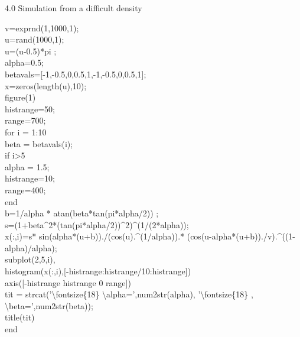 \documentclass[twoside,twocolumn]{article}
\begin{document}
\begin{large}
4.0 Simulation from a difficult density
\end{large}
\newline
\begin{itshape}
v=exprnd(1,1000,1);\\
u=rand(1000,1);\\
u=(u-0.5)*pi ;\\
alpha=0.5;\\
betavals=[-1,-0.5,0,0.5,1,-1,-0.5,0,0.5,1];\\
x=zeros(length(u),10);\\

figure(1)\\
histrange=50;\\
range=700;\\

for i = 1:10\\
beta = betavals(i);\\
if i>5\\
    alpha = 1.5;\\
    histrange=10;\\
    range=400;\\
end \\
b=1/alpha * atan(beta*tan(pi*alpha/2)) ;\\
s=(1+beta\^{}2*(tan(pi*alpha/2))\^{}2)\^{}(1/(2*alpha));\\
x(:,i)=s* sin(alpha*(u+b))./(cos(u).\^{}(1/alpha)).* (cos(u-alpha*(u+b))./v).\^{}((1-alpha)/alpha); \\
subplot(2,5,i),\\
histogram(x(:,i),[-histrange:histrange/10:histrange])\\
axis([-histrange histrange 0 range])\\
tit = strcat('\textbackslash fontsize\{18\} \textbackslash alpha=',num2str(alpha), '\textbackslash fontsize\{18\} , \textbackslash beta=',num2str(beta));\\
title(tit)\\
end\\
\end{itshape}




\end{document}
